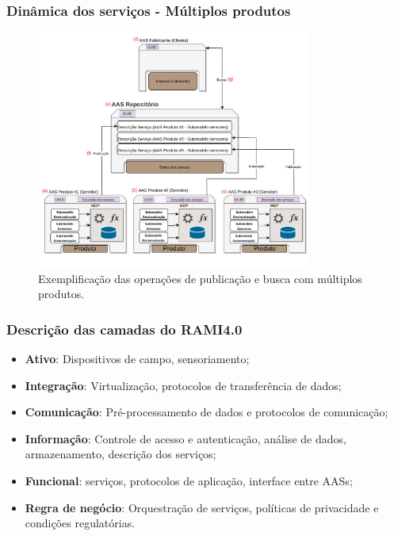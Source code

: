 \documentclass[10pt]{beamer}
\begin{document}
\begin{frame}
	
	\frametitle{Dinâmica dos serviços - Múltiplos produtos}
	
	\begin{figure}[htb]
		\centering
		\caption{Exemplificação das operações de publicação e busca com múltiplos produtos.}
		\label{fig:webservice-multiproduto}
		\includegraphics[width=0.8\textwidth]{webservice-multiproduto}
	\end{figure}
	
\end{frame}
\begin{frame}
	
	\frametitle{Descrição das camadas do RAMI4.0}
	
	\begin{itemize}
		\item \textbf{Ativo}: Dispositivos de campo, sensoriamento; 
		\item \textbf{Integração}: Virtualização, protocolos de transferência de dados; 
		\item \textbf{Comunicação}: Pré-processamento de dados e protocolos de comunicação; 
		\item \textbf{Informação}: Controle de acesso e autenticação, análise de dados, armazenamento, descrição dos serviços;
		\item \textbf{Funcional}: serviços, protocolos de aplicação, interface entre AASs; 
		\item \textbf{Regra de negócio}: Orquestração de serviços, políticas de privacidade e condições regulatórias.
	\end{itemize}
	
\end{frame}
\end{document}
